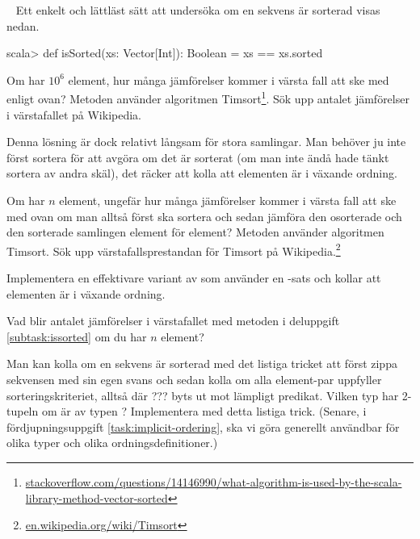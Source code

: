 \QUESTEND


\clearpage

\ExtraTasks %





\QUESTBEGIN

\Task \label{task:isSorted} \what~   Ett enkelt och lättläst sätt att undersöka om en sekvens är sorterad visas nedan.
\begin{REPL}
scala> def isSorted(xs: Vector[Int]): Boolean = xs == xs.sorted
\end{REPL}


\Subtask\Pen  Om  har $10^6$ element, hur många jämförelser kommer i värsta fall att ske med  enligt ovan? Metoden  använder algoritmen Timsort\footnote{\href{http://stackoverflow.com/questions/14146990/what-algorithm-is-used-by-the-scala-library-method-vector-sorted}{stackoverflow.com/questions/14146990/what-algorithm-is-used-by-the-scala-library-method-vector-sorted}}. Sök upp antalet jämförelser i värstafallet på Wikipedia.

Denna lösning är dock relativt långsam för stora samlingar. Man behöver ju inte först sortera  för att avgöra om det är sorterat (om man inte ändå hade tänkt sortera av andra skäl), det räcker att kolla att elementen är i växande ordning.

\Subtask\Pen  Om  har $n$ element, ungefär hur många jämförelser kommer i värsta fall att ske med  ovan om man alltså först ska sortera och sedan jämföra den osorterade och den sorterade samlingen element för element? Metoden  använder algoritmen Timsort. Sök upp värstafallsprestandan för Timsort på Wikipedia.\footnote{\href{https://en.wikipedia.org/wiki/Timsort}{en.wikipedia.org/wiki/Timsort}}

\Subtask\label{subtask:issorted} Implementera en effektivare variant av  som använder en -sats och kollar att elementen är i växande ordning.

\Subtask\Pen Vad blir antalet jämförelser i värstafallet med metoden i deluppgift \ref{subtask:issorted} om du har $n$ element?


\Subtask \label{subtask:isSorted-zip} Man kan kolla om en sekvens är sorterad med det listiga tricket att först zippa sekvensen med sin egen svans och sedan kolla om alla element-par uppfyller sorteringskriteriet, alltså  där ??? byts ut mot lämpligt predikat. Vilken typ har 2-tupeln  om  är av typen ? Implementera  med detta listiga trick. (Senare, i fördjupningsuppgift \ref{task:implicit-ordering}, ska vi göra  generellt användbar för olika typer och olika ordningsdefinitioner.)


